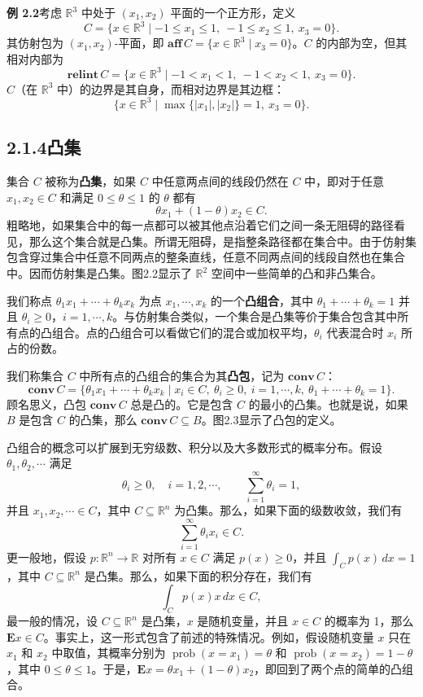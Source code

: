 \documentclass[UTF8,12pt,a4paper,fontset=fandol]{ctexart}
\begin{document}
\noindent\textbf{例 2.2}\quad 考虑 $\mathbb{R}^3$ 中处于 $(x_1,x_2)$ 平面的一个正方形，定义
\[
  C=\{x\in\mathbb{R}^3\mid -1\le x_1\le 1,\ -1\le x_2\le 1,\ x_3=0\}.
\]
其仿射包为 $(x_1,x_2)$-平面，即 $\mathbf{aff}\,C=\{x\in\mathbb{R}^3\mid x_3=0\}$。$C$ 的内部为空，但其相对内部为
\[
  \mathbf{relint}\,C=\{x\in\mathbb{R}^3\mid -1<x_1<1,\ -1<x_2<1,\ x_3=0\}.
\]
$C$（在 $\mathbb{R}^3$ 中）的边界是其自身，而相对边界是其边框：
\[
  \{x\in\mathbb{R}^3\mid \max\{|x_1|,|x_2|\}=1,\ x_3=0\}.
\]

\subsection*{2.1.4\quad 凸集}

集合 $C$ 被称为\textbf{凸集}，如果 $C$ 中任意两点间的线段仍然在 $C$ 中，即对于任意 $x_1,x_2\in C$ 和满足 $0\le\theta\le 1$ 的 $\theta$ 都有
\[
  \theta x_1+(1-\theta)x_2\in C.
\]
粗略地，如果集合中的每一点都可以被其他点沿着它们之间一条无阻碍的路径看见，那么这个集合就是凸集。所谓无阻碍，是指整条路径都在集合中。由于仿射集包含穿过集合中任意不同两点的整条直线，任意不同两点间的线段自然也在集合中。因而仿射集是凸集。图2.2显示了 $\mathbb{R}^2$ 空间中一些简单的凸和非凸集合。

我们称点 $\theta_1x_1+\cdots+\theta_kx_k$ 为点 $x_1,\cdots,x_k$ 的一个\textbf{凸组合}，其中 $\theta_1+\cdots+\theta_k=1$ 并且 $\theta_i\ge 0$，$i=1,\cdots,k$。与仿射集合类似，一个集合是凸集等价于集合包含其中所有点的凸组合。点的凸组合可以看做它们的混合或加权平均，$\theta_i$ 代表混合时 $x_i$ 所占的份数。

我们称集合 $C$ 中所有点的凸组合的集合为其\textbf{凸包}，记为 $\mathbf{conv}\,C$：
\[
  \mathbf{conv}\,C=\{\theta_1x_1+\cdots+\theta_kx_k\mid x_i\in C,\ \theta_i\ge 0,\ i=1,\cdots,k,\ \theta_1+\cdots+\theta_k=1\}.
\]
顾名思义，凸包 $\mathbf{conv}\,C$ 总是凸的。它是包含 $C$ 的最小的凸集。也就是说，如果 $B$ 是包含 $C$ 的凸集，那么 $\mathbf{conv}\,C\subseteq B$。图2.3显示了凸包的定义。

凸组合的概念可以扩展到无穷级数、积分以及大多数形式的概率分布。假设 $\theta_1,\theta_2,\cdots$ 满足
\[
  \theta_i\ge 0,\quad i=1,2,\cdots,\qquad
  \sum_{i=1}^{\infty}\theta_i=1,
\]
并且 $x_1,x_2,\cdots\in C$，其中 $C\subseteq\mathbb{R}^n$ 为凸集。那么，如果下面的级数收敛，我们有
\[
  \sum_{i=1}^{\infty}\theta_i x_i\in C.
\]
更一般地，假设 $p:\mathbb{R}^n\to\mathbb{R}$ 对所有 $x\in C$ 满足 $p(x)\ge 0$，并且 $\int_C p(x)\,dx=1$，其中 $C\subseteq\mathbb{R}^n$ 是凸集。那么，如果下面的积分存在，我们有
\[
  \int_C p(x)x\,dx\in C,
\]
最一般的情况，设 $C\subseteq\mathbb{R}^n$ 是凸集，$x$ 是随机变量，并且 $x\in C$ 的概率为 1，那么 $\mathbf{E}x\in C$。事实上，这一形式包含了前述的特殊情况。例如，假设随机变量 $x$ 只在 $x_1$ 和 $x_2$ 中取值，其概率分别为 $\operatorname{prob}(x=x_1)=\theta$ 和 $\operatorname{prob}(x=x_2)=1-\theta$，其中 $0\le\theta\le 1$。于是，$\mathbf{E}x=\theta x_1+(1-\theta)x_2$，即回到了两个点的简单的凸组合。
\end{document}
